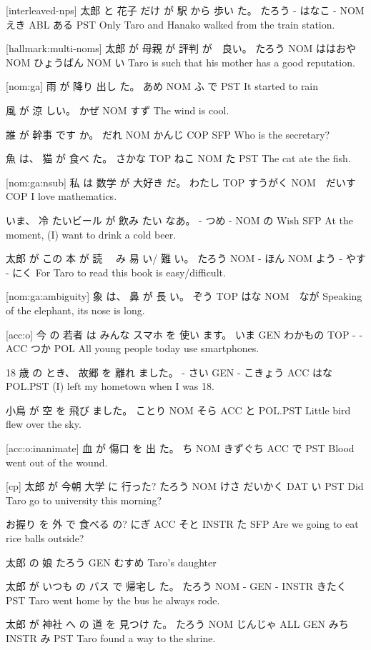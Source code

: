 [interleaved-nps]
太郎  と 花子  だけ が  駅  から 歩い  た。
たろう - はなこ -  NOM えき ABL ある  PST
Only Taro and Hanako walked from the train station.

[hallmark:multi-noms]
太郎  が   母親    が   評判      が　良い。
たろう NOM ははおや NOM ひょうばん NOM い
Taro is such that his mother has a good reputation.

[nom:ga]
雨  が   降り 出し た。
あめ NOM ふ   で PST
It started to rain

風  が   涼 しい。
かぜ NOM すず
The wind is cool.

誰  が   幹事   です か。
だれ NOM かんじ  COP SFP
Who is the secretary?

魚    は、 猫   が  食べ た。
さかな TOP ねこ NOM た  PST
The cat ate the fish.

[nom:ga:nsub]
私    は   数学    が   大好き だ。
わたし TOP すうがく NOM　だいす COP
I love mathematics.

いま、 冷  たいビール が  飲み たい なあ。
-    つめ -       NOM  の  Wish SFP
At the moment, (I) want to drink a cold beer.

太郎   が この 本   が  読 　み 易 い/ 難 い。
たろう NOM -  ほん NOM よう - やす - にく
For Taro to read this book is easy/difficult.

[nom:ga:ambiguity]
象   は、 鼻  が   長 い。
ぞう TOP はな NOM　なが
Speaking of the elephant, its nose is long.

[acc:o]
今   の  若者    は  みんな スマホ を  使い ます。
いま GEN わかもの TOP -    -     ACC つか POL
All young people today use smartphones.

18 歳  の  とき、 故郷    を  離れ ました。
- さい GEN -    こきょう ACC はな POL.PST
(I) left my hometown when I was 18.

小鳥   が  空   を  飛び ました。
ことり NOM そら ACC と   POL.PST
Little bird flew over the sky.

[acc:o:inanimate]
血 が  傷口     を  出 た。
ち NOM きずぐち ACC で PST
Blood went out of the wound.

[cp]
太郎   が  今朝 大学    に   行った?
たろう NOM けさ だいかく DAT い PST
Did Taro go to university this morning?

お握り を   外  で      食べる の?
にぎ   ACC そと INSTR  た SFP
Are we going to eat rice balls outside?

太郎   の   娘
たろう GEN むすめ
Taro's daughter

太郎   が いつも の  バス で    帰宅し た。
たろう NOM -    GEN -   INSTR きたく PST
Taro went home by the bus he always rode.

太郎   が  神社    へ   の  道   を    見つけ た。
たろう NOM じんじゃ ALL GEN みち INSTR み    PST
Taro found a way to the shrine.

